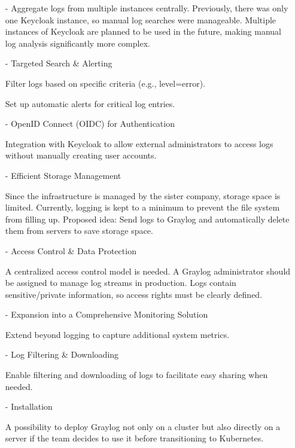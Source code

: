 \documentclass[../main.tex]{subfiles}
\begin{document}
\begin{enumerate}
    \item[-] Aggregate logs from multiple instances centrally. Previously, there was only one Keycloak instance, so manual log searches were manageable. Multiple instances of Keycloak are planned to be used in the future, making manual log analysis significantly more complex.

    \item[-] Targeted Search \& Alerting
    
    Filter logs based on specific criteria (e.g., level=error).
    
    Set up automatic alerts for critical log entries.

    \item[-] OpenID Connect (OIDC) for Authentication

    Integration with Keycloak to allow external administrators to access logs without manually creating user accounts.

    \item[-] Efficient Storage Management
    
    Since the infrastructure is managed by the sister company, storage space is limited. Currently, logging is kept to a minimum to prevent the file system from filling up. Proposed idea: Send logs to Graylog and automatically delete them from servers to save storage space.

    \item[-] Access Control \& Data Protection

    A centralized access control model is needed. A Graylog administrator should be assigned to manage log streams in production. Logs contain sensitive/private information, so access rights must be clearly defined.

    \item[-] Expansion into a Comprehensive Monitoring Solution

    Extend beyond logging to capture additional system metrics.
    
    \item[-] Log Filtering \& Downloading
    
    Enable filtering and downloading of logs to facilitate easy sharing when needed.

    \item[-] Installation

    A possibility to deploy Graylog not only on a cluster but also directly on a server if the team decides to use it before transitioning to Kubernetes.

\end{enumerate}
\end{document}
